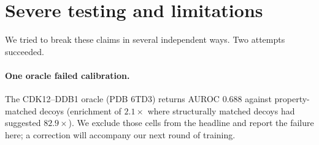 \documentclass{article}
\newcommand{\checkval}[1]{#1}
\begin{document}




\section{Severe testing and limitations}
\label{sec:severe}

We tried to break these claims in several independent ways. Two attempts succeeded.

\paragraph{One oracle failed calibration.}
The CDK12--DDB1 oracle (PDB 6TD3) returns AUROC \checkval{0.688} against property-matched decoys (enrichment of \checkval{$2.1\times$} where structurally matched decoys had
suggested \checkval{$82.9\times$}). We exclude those cells from the headline and report the failure here; a correction will accompany our next round of training.
\end{document}
